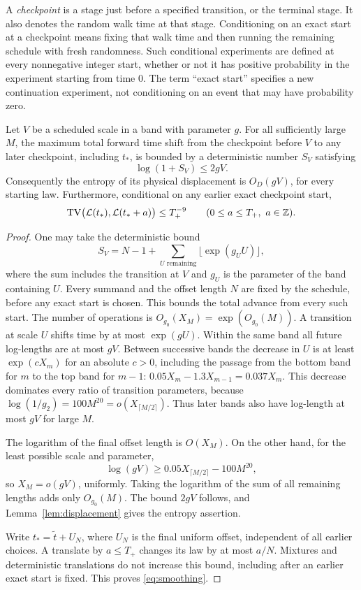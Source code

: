 A \emph{checkpoint} is a stage just before a specified transition,
or the terminal stage. It also denotes the random walk time at that
stage. Conditioning on an exact start at a checkpoint means fixing that
walk time and then running the remaining schedule with fresh randomness.
Such conditional experiments are defined at every nonnegative integer
start, whether or not it has positive probability in the experiment
starting from time \(0\).
The term ``exact start'' specifies a new continuation experiment,
not conditioning on an event that may have probability zero.
\begin{lemma}\label{lem:future-shift}
Let \(V\) be a scheduled scale in a band with parameter \(g\).
For all sufficiently large \(M\), the maximum total forward time shift
from the checkpoint before \(V\) to any later checkpoint, including
\(t_*\), is bounded by a deterministic number \(S_V\) satisfying
\[
\log(1+S_V)\le2gV.
\]
Consequently the entropy of its physical displacement is \(O_D(gV)\),
for every starting law.
Furthermore, conditional on any earlier exact checkpoint start,
\begin{equation}\label{eq:smoothing}
\operatorname{TV}\bigl(\mathcal L(t_*),\mathcal L(t_*+a)\bigr)
\le T_+^{-9}\qquad
(0\le a\le T_+,\ a\in\mathbb Z).
\end{equation}
\end{lemma}
\begin{proof}
One may take the deterministic bound
\[
 S_V=N-1+\sum_{U\text{ remaining}}\lfloor\exp(g_U U)\rfloor,
\]
where the sum includes the transition at $V$ and $g_U$ is the parameter
of the band containing $U$. Every summand and the offset length $N$
are fixed by the schedule, before any exact start is chosen. This bounds
the total advance from every such start.
The number of operations is \(O_{g_0}(X_M)=\exp(O_{g_0}(M))\).
A transition at scale \(U\) shifts time by at most \(\exp(gU)\).
Within the same band all future log-lengths are at most \(gV\).
Between successive bands the decrease in \(U\) is at least
\(\exp(cX_m)\) for an absolute \(c>0\), including the passage from
the bottom band for \(m\) to the top band for \(m-1\):
\(0.05X_m-1.3X_{m-1}=0.037X_m\).
This decrease dominates every ratio of transition parameters, because
\(\log(1/g_2)=100M^{20}=o(X_{\lceil M/2\rceil})\).
Thus later bands also have log-length at most \(gV\) for large \(M\).

The logarithm of the final offset length is \(O(X_M)\).
On the other hand, for the least possible scale and parameter,
\[
\log(gV)\ge 0.05X_{\lceil M/2\rceil}-100M^{20},
\]
so \(X_M=o(gV)\), uniformly.
Taking the logarithm of the sum of all remaining lengths adds only
\(O_{g_0}(M)\). The bound \(2gV\) follows, and
Lemma~\ref{lem:displacement} gives the entropy assertion.

Write \(t_*=\widetilde t+U_N\), where \(U_N\) is the final uniform
offset, independent of all earlier choices.
A translate by \(a\le T_+\) changes its law by at most \(a/N\).
Mixtures and deterministic translations do not increase this bound,
including after an earlier exact start is fixed.
This proves \eqref{eq:smoothing}.
\end{proof}

